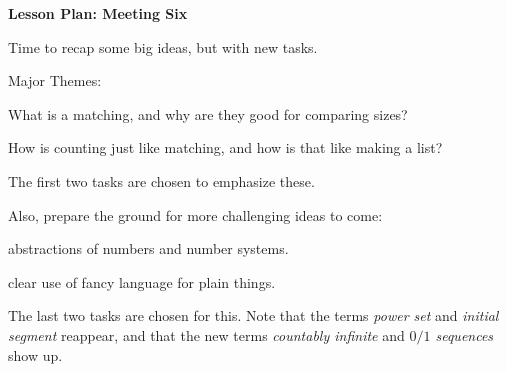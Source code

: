 \documentclass[12pt]{amsart}
\theoremstyle{definition}
\begin{document}
\begin{center}
\textbf{\Huge
Lesson Plan: Meeting Six
}
\end{center}
\vspace{.5in}

Time to recap some big ideas, but with new tasks.

Major Themes:

\begin{compactitem}
\item What is a matching, and why are they good for comparing sizes?
\item How is counting just like matching, and how is that like making a list?
\end{compactitem}

\vspace{.1in}

The first two tasks are chosen to emphasize these.

\vspace{.1in}

Also, prepare the ground for more challenging ideas to come:
\begin{compactitem}
\item abstractions of numbers and number systems.
\item clear use of fancy language for plain things.
\end{compactitem}

\vspace{.1in}

The last two tasks are chosen for this.
Note that the terms \emph{power set} and \emph{initial segment} reappear, and that the new terms \emph{countably infinite} and \emph{$0/1$ sequences} show up.
\end{document}
